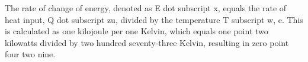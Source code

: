The rate of change of energy, denoted as E dot subscript x, equals the rate of heat input, Q dot subscript zu, divided by the temperature T subscript w, e. This is calculated as one kilojoule per one Kelvin, which equals one point two kilowatts divided by two hundred seventy-three Kelvin, resulting in zero point four two nine.